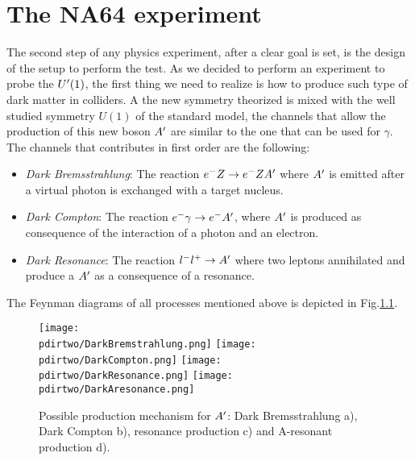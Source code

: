 
\newcommand{\pdirtwo}{chapters/chapter2/plots}

\chapter{The NA64 experiment} %

\label{chapter2} %


The second step of any physics experiment, after a clear goal is set, is the design of the setup to perform the test. As we decided to perform an experiment to probe the $U'(1)$, the first thing we need to realize is how to produce such type of dark matter in colliders. A the new symmetry theorized is mixed with the well studied symmetry $U(1)$ of the standard model, the channels that allow the production of this new boson $A'$ are similar to the one that can be used for $\gamma$. The channels that contributes in first order are the following:

\begin{itemize}
\item \textit{Dark Bremsstrahlung}: The reaction $e^- Z \to e^- Z A'$ where $A'$ is emitted after a virtual photon is exchanged with a target nucleus.
\item \textit{Dark Compton}: The reaction $e^- \gamma \to e^- A'$, where $A'$ is produced as consequence of the interaction of a photon and an electron.
\item \textit{Dark Resonance}: The reaction $l^- l^+ \to A'$ where two leptons annihilated and produce a $A'$ as a consequence of a resonance.
\end{itemize}

The Feynman diagrams of all processes mentioned above is depicted in Fig.\ref{fig:dm-production-mechanism}.

\begin{figure}
  \centering
  \texttt{[image: \\pdirtwo/DarkBremstrahlung.png]}
  \texttt{[image: \\pdirtwo/DarkCompton.png]}
  \texttt{[image: \\pdirtwo/DarkResonance.png]}
  \texttt{[image: \\pdirtwo/DarkAresonance.png]}
  \caption{Possible production mechanism for $A'$: Dark Bremsstrahlung a), Dark Compton b), resonance production c) and A-resonant production d).}
  \label{fig:dm-production-mechanism}
\end{figure}

